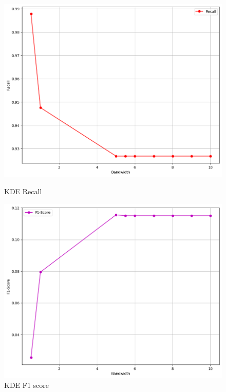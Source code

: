 \begin{figure}[p]
\begin{minipage}[t]{0.5\textwidth}
    \end{minipage}
    \\
    \begin{minipage}[t]{0.5\textwidth}
        \vspace{0pt}
        \includegraphics[width=\textwidth]{images/kde-recall.png}
        \caption{KDE Recall}
    \end{minipage}
    \hfill
    \begin{minipage}[t]{0.5\textwidth}
        \vspace{0pt}
        \includegraphics[width=\textwidth]{images/kde-f1-score.png}
        \caption{KDE F1 score}
    \end{minipage}
\end{figure}

